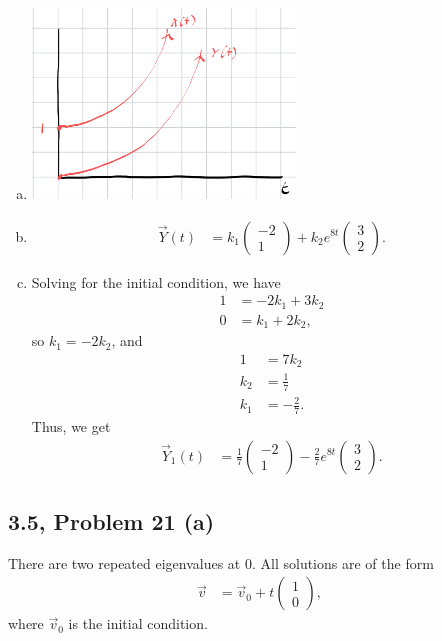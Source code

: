 \documentclass[10pt]{mypackage}
\begin{document}
\begin{enumerate}[(a)]
\begin{center}
    \end{center}
  \item 
    \begin{center}
      \includegraphics[width=7cm]{images/3_5_18d.png}
    \end{center}
  \item 
    \begin{align*}
      \vec{Y}(t) &= k_1 \begin{pmatrix}-2\\1\end{pmatrix} + k_2e^{8t} \begin{pmatrix}3\\2\end{pmatrix}.
    \end{align*}
  \item Solving for the initial condition, we have
    \begin{align*}
      1 &= -2k_1 + 3k_2\\
      0 &= k_1 + 2k_2,
    \end{align*}
    so $k_1 = -2k_2$, and
    \begin{align*}
      1 &= 7k_2\\
      k_2 &= \frac{1}{7}\\
      k_1 &= -\frac{2}{7}.
    \end{align*}
    Thus, we get
    \begin{align*}
      \vec{Y}_1(t) &= \frac{1}{7} \begin{pmatrix}-2\\1\end{pmatrix} -\frac{2}{7}e^{8t} \begin{pmatrix}3\\2\end{pmatrix}.
    \end{align*}
\end{enumerate}
\subsection{3.5, Problem 21 (a)}%
There are two repeated eigenvalues at $0$. All solutions are of the form
\begin{align*}
  \vec{v} &= \vec{v}_0 + t \begin{pmatrix}1\\0\end{pmatrix},
\end{align*}
where $\vec{v}_0$ is the initial condition.
\end{document}
